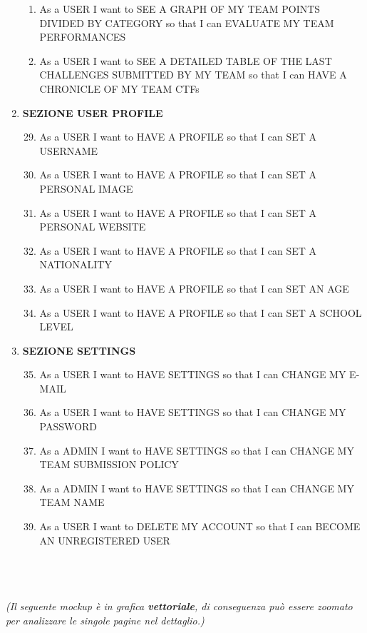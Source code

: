 \documentclass[a4paper,12pt]{extarticle}
\begin{document}
\begin{enumerate}[label=\Alph*)]
\begin{enumerate}[label=\textbf{\arabic*.}]
		    \item As a USER I want to SEE A GRAPH OF MY TEAM POINTS DIVIDED BY CATEGORY so that I can EVALUATE MY TEAM PERFORMANCES
		    \item As a USER I want to SEE A DETAILED TABLE OF THE LAST CHALLENGES SUBMITTED BY MY TEAM so that I can HAVE A CHRONICLE OF MY TEAM CTFs
		\end{enumerate}
		\item \textbf{SEZIONE USER PROFILE}
		\begin{enumerate}[label=\textbf{\arabic*.}]
		\setcounter{enumii}{28}
            \item As a USER I want to HAVE A PROFILE so that I can SET A USERNAME
            \item As a USER I want to HAVE A PROFILE so that I can SET A PERSONAL IMAGE
            \item As a USER I want to HAVE A PROFILE so that I can SET A PERSONAL WEBSITE
            \item As a USER I want to HAVE A PROFILE so that I can SET A NATIONALITY
            \item As a USER I want to HAVE A PROFILE so that I can SET AN AGE 
            \item As a USER I want to HAVE A PROFILE so that I can SET A SCHOOL LEVEL  
		\end{enumerate}
	\clearpage
		\item \textbf{SEZIONE SETTINGS}
		\begin{enumerate}[label=\textbf{\arabic*.}]
		\setcounter{enumii}{34}
            \item As a USER I want to HAVE SETTINGS so that I can CHANGE MY E-MAIL
            \item As a USER I want to HAVE SETTINGS so that I can CHANGE MY PASSWORD
            \item As a ADMIN I want to HAVE SETTINGS so that I can CHANGE MY TEAM SUBMISSION POLICY
            \item As a ADMIN I want to HAVE SETTINGS so that I can CHANGE MY TEAM NAME
            \item As a USER I want to DELETE MY ACCOUNT so that I can BECOME AN UNREGISTERED USER\\\\\\\\
		\end{enumerate}
\end{enumerate}
\textit{(Il seguente mockup è in grafica \textbf{vettoriale}, di conseguenza può essere zoomato per analizzare le singole pagine nel dettaglio.)}
\end{document}
